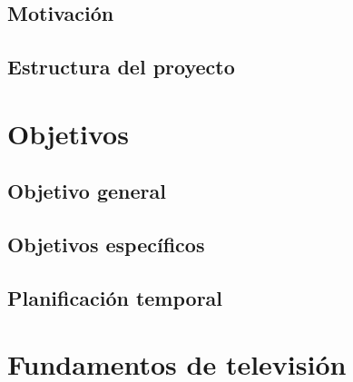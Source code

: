 \documentclass[a4paper, 12pt]{report}
\begin{document}
\section{Motivación}
\label{sec:motivacion}


\section{Estructura del proyecto}
\label{sec:estructura}




\cleardoublepage %
\chapter{Objetivos} %
\label{chap:objetivos} %

\section{Objetivo general} %
\label{sec:objetivo-general} %

\section{Objetivos específicos}
\label{sec:objetivos-especificos}

\section{Planificación temporal}
\label{sec:planificacion-temporal}



\cleardoublepage
\chapter{Fundamentos de televisión}
\end{document}
